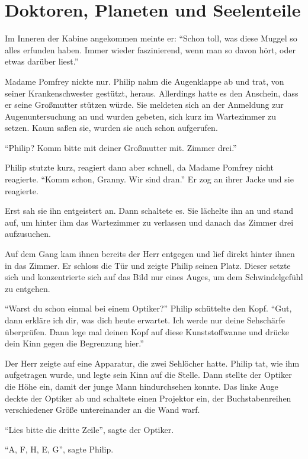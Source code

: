 \chapter{Doktoren, Planeten und Seelenteile}

Im Inneren der Kabine angekommen meinte er: \enquote{Schon toll, was diese Muggel so alles erfunden haben. Immer wieder faszinierend, wenn man so davon hört, oder etwas darüber liest.}

Madame Pomfrey nickte nur. Philip nahm die Augenklappe ab und trat, von seiner Krankenschwester gestützt, heraus. Allerdings hatte es den Anschein, dass er seine Großmutter stützen würde. Sie meldeten sich an der Anmeldung zur Augenuntersuchung an und wurden gebeten, sich kurz im Wartezimmer zu setzen. Kaum saßen sie, wurden sie auch schon aufgerufen.

\enquote{Philip? Komm bitte mit deiner Großmutter mit. Zimmer drei.}

Philip stutzte kurz, reagiert dann aber schnell, da Madame Pomfrey nicht reagierte. \enquote{Komm schon, Granny. Wir sind dran.} Er zog an ihrer Jacke und sie reagierte.

Erst sah sie ihn entgeistert an. Dann schaltete es.  Sie lächelte ihn an und stand auf, um hinter ihm das Wartezimmer zu verlassen und danach das Zimmer drei aufzusuchen.

Auf dem Gang kam ihnen bereits der Herr entgegen und lief direkt hinter ihnen in das Zimmer. Er schloss die Tür und zeigte Philip seinen Platz. Dieser setzte sich und konzentrierte sich auf das Bild nur eines Auges, um dem Schwindelgefühl zu entgehen.

\enquote{Warst du schon einmal bei einem Optiker?} Philip schüttelte den Kopf. \enquote{Gut, dann erkläre ich dir, was dich heute erwartet. Ich werde nur deine Sehschärfe überprüfen.
Dann lege mal deinen Kopf auf diese Kunststoffwanne und drücke dein Kinn gegen die Begrenzung hier.}

Der Herr zeigte auf eine Apparatur, die zwei Sehlöcher hatte. Philip tat, wie ihm aufgetragen wurde, und legte sein Kinn auf die Stelle. Dann stellte der Optiker die Höhe ein, damit der junge Mann hindurchsehen konnte. Das linke Auge deckte der Optiker ab und schaltete einen Projektor ein, der Buchstabenreihen verschiedener Größe untereinander an die Wand warf.

\enquote{Lies bitte die dritte Zeile}, sagte der Optiker.

\enquote{A, F, H, E, G}, sagte Philip.

